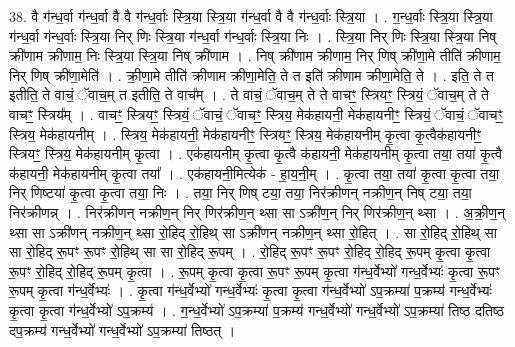 \documentclass[17pt]{extarticle}
\begin{document}
38. वै ग॑न्ध॒र्वा ग॑न्ध॒र्वा वै वै ग॑न्ध॒र्वाः स्त्रि॒या स्त्रि॒या ग॑न्ध॒र्वा वै वै ग॑न्ध॒र्वाः स्त्रि॒या । . ग॒न्ध॒र्वाः स्त्रि॒या स्त्रि॒या ग॑न्ध॒र्वा ग॑न्ध॒र्वाः स्त्रि॒या निर् णिः स्त्रि॒या ग॑न्ध॒र्वा ग॑न्ध॒र्वाः स्त्रि॒या निः । . स्त्रि॒या निर् णिः स्त्रि॒या स्त्रि॒या निष् क्री॑णाम क्रीणाम॒ निः स्त्रि॒या स्त्रि॒या निष् क्री॑णाम । . निष् क्री॑णाम क्रीणाम॒ निर् णिष् क्री॑णा॒मे तीति॑ क्रीणाम॒ निर् णिष् क्री॑णा॒मेति॑ । . क्री॒णा॒मे तीति॑ क्रीणाम क्रीणा॒मेति॒ ते त इति॑ क्रीणाम क्रीणा॒मेति॒ ते । . इति॒ ते त इतीति॒ ते वाचं॒ ॅवाच॒म् त इतीति॒ ते वाच᳚म् । . ते वाचं॒ ॅवाच॒म् ते ते वाचꣳ॒॒ स्त्रियꣳ॒॒ स्त्रियं॒ ॅवाच॒म् ते ते वाचꣳ॒॒ स्त्रिय᳚म् । . वाचꣳ॒॒ स्त्रियꣳ॒॒ स्त्रियं॒ ॅवाचं॒ ॅवाचꣳ॒॒ स्त्रिय॒ मेक॑हायनी॒ मेक॑हायनीꣳ॒॒ स्त्रियं॒ ॅवाचं॒ ॅवाचꣳ॒॒ स्त्रिय॒ मेक॑हायनीम् । . स्त्रिय॒ मेक॑हायनी॒ मेक॑हायनीꣳ॒॒ स्त्रियꣳ॒॒ स्त्रिय॒ मेक॑हायनीम् कृ॒त्वा कृ॒त्वैक॑हायनीꣳ॒॒ स्त्रियꣳ॒॒ स्त्रिय॒ मेक॑हायनीम् कृ॒त्वा । . एक॑हायनीम् कृ॒त्वा कृ॒त्वै क॑हायनी॒ मेक॑हायनीम् कृ॒त्वा तया॒ तया॑ कृ॒त्वै क॑हायनी॒ मेक॑हायनीम् कृ॒त्वा तया᳚ । . एक॑हायनी॒मित्येक॑ - हा॒य॒नी॒म् । . कृ॒त्वा तया॒ तया॑ कृ॒त्वा कृ॒त्वा तया॒ निर् णिष्टया॑ कृ॒त्वा कृ॒त्वा तया॒ निः । . तया॒ निर् णिष् टया॒ तया॒ निर॑क्रीणन् नक्रीण॒न् निष् टया॒ तया॒ निर॑क्रीणन्न् । . निर॑क्रीणन् नक्रीण॒न् निर् णिर॑क्रीण॒न् थ्सा सा ऽक्री॑ण॒न् निर् णिर॑क्रीण॒न् थ्सा । . अ॒क्री॒ण॒न् थ्सा सा ऽक्री॑णन् नक्रीण॒न् थ्सा रो॒हिद् रो॒हिथ् सा ऽक्री॑णन् नक्रीण॒न् थ्सा रो॒हित् । . सा रो॒हिद् रो॒हिथ् सा सा रो॒हिद् रू॒पꣳ रू॒पꣳ रो॒हिथ् सा सा रो॒हिद् रू॒पम् । . रो॒हिद् रू॒पꣳ रू॒पꣳ रो॒हिद् रो॒हिद् रू॒पम् कृ॒त्वा कृ॒त्वा रू॒पꣳ रो॒हिद् रो॒हिद् रू॒पम् कृ॒त्वा । . रू॒पम् कृ॒त्वा कृ॒त्वा रू॒पꣳ रू॒पम् कृ॒त्वा ग॑न्ध॒र्वेभ्यो॑ गन्ध॒र्वेभ्यः॑ कृ॒त्वा रू॒पꣳ रू॒पम् कृ॒त्वा ग॑न्ध॒र्वेभ्यः॑ । . कृ॒त्वा ग॑न्ध॒र्वेभ्यो॑ गन्ध॒र्वेभ्यः॑ कृ॒त्वा कृ॒त्वा ग॑न्ध॒र्वेभ्यो॑ ऽप॒क्रम्या॑ प॒क्रम्य॑ गन्ध॒र्वेभ्यः॑ कृ॒त्वा कृ॒त्वा ग॑न्ध॒र्वेभ्यो॑ ऽप॒क्रम्य॑ । . ग॒न्ध॒र्वेभ्यो॑ ऽप॒क्रम्या॑ प॒क्रम्य॑ गन्ध॒र्वेभ्यो॑ गन्ध॒र्वेभ्यो॑ ऽप॒क्रम्या॑ तिष्ठ दतिष्ठ दप॒क्रम्य॑ गन्ध॒र्वेभ्यो॑ गन्ध॒र्वेभ्यो॑ ऽप॒क्रम्या॑ तिष्ठत् । \newline
\pagebreak
{}
\end{document}
